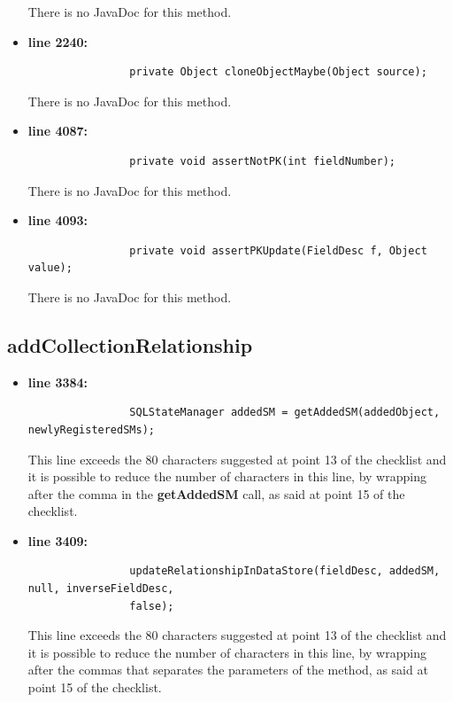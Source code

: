 \documentclass[18pt,oneside,a4paper, titlepage]{article}
\begin{document}
\begin{itemize}
				There is no JavaDoc for this method.
				\item \textbf{line 2240:} \begin{lstlisting}
				private Object cloneObjectMaybe(Object source);
				\end{lstlisting}
				\vspace{0.1cm}
				
				There is no JavaDoc for this method.
				\item \textbf{line 4087:} \begin{lstlisting}
				private void assertNotPK(int fieldNumber);
				\end{lstlisting}
				\vspace{0.1cm}
				
				There is no JavaDoc for this method.
				\item \textbf{line 4093:} \begin{lstlisting}
				private void assertPKUpdate(FieldDesc f, Object value);
				\end{lstlisting}
				\vspace{0.1cm}
				
				There is no JavaDoc for this method.
				
				
				
			\end{itemize}
		\subsection{addCollectionRelationship}
			\begin{itemize}
				\item \textbf{line 3384:} \begin{lstlisting}
				SQLStateManager addedSM = getAddedSM(addedObject, newlyRegisteredSMs);
				\end{lstlisting}
				\vspace{0.1cm}
				This line exceeds the 80 characters suggested at point 13 of the checklist and it is possible to reduce the number of characters in this line, by wrapping after the comma in the \textbf{getAddedSM} call, as said at point 15 of the checklist.
				\item \textbf{line 3409:} \begin{lstlisting}
				updateRelationshipInDataStore(fieldDesc, addedSM, null, inverseFieldDesc,
				false);
				\end{lstlisting}
				\vspace{0.1cm}
				This line exceeds the 80 characters suggested at point 13 of the checklist and it is possible to reduce the number of characters in this line, by wrapping after the commas that separates the parameters of the method, as said at point 15 of the checklist.
			\end{itemize}
\end{document}
